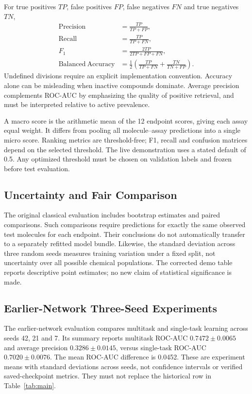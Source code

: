 \documentclass[conference]{IEEEtran}
\begin{document}
For true positives $TP$, false positives $FP$, false negatives $FN$ and true negatives $TN$,
\begin{align}
\mathrm{Precision}&=\frac{TP}{TP+FP},\\
\mathrm{Recall}&=\frac{TP}{TP+FN},\\
F_1&=\frac{2TP}{2TP+FP+FN},\\
\mathrm{Balanced\ Accuracy}&=\frac{1}{2}\left(\frac{TP}{TP+FN}+\frac{TN}{TN+FP}\right).
\end{align}
Undefined divisions require an explicit implementation convention. Accuracy alone can be misleading when inactive compounds dominate. Average precision complements ROC-AUC by emphasizing the quality of positive retrieval, and must be interpreted relative to active prevalence.

A macro score is the arithmetic mean of the 12 endpoint scores, giving each assay equal weight. It differs from pooling all molecule--assay predictions into a single micro score. Ranking metrics are threshold-free; F1, recall and confusion matrices depend on the selected threshold. The live demonstration uses a stated default of 0.5. Any optimized threshold must be chosen on validation labels and frozen before test evaluation.

\subsection{Uncertainty and Fair Comparison}
The original classical evaluation includes bootstrap estimates and paired comparisons. Such comparisons require predictions for exactly the same observed test molecules for each endpoint. Their conclusions do not automatically transfer to a separately refitted model bundle. Likewise, the standard deviation across three random seeds measures training variation under a fixed split, not uncertainty over all possible chemical populations. The corrected demo table reports descriptive point estimates; no new claim of statistical significance is made.


\subsection{Earlier-Network Three-Seed Experiments}
The earlier-network evaluation compares multitask and single-task learning across seeds 42, 21 and 7. Its summary reports multitask ROC-AUC $0.7472\pm0.0065$ and average precision $0.3286\pm0.0145$, versus single-task ROC-AUC $0.7020\pm0.0076$. The mean ROC-AUC difference is 0.0452. These are experiment means with standard deviations across seeds, not confidence intervals or verified saved-checkpoint metrics. They must not replace the historical row in Table~\ref{tab:main}.
\end{document}

